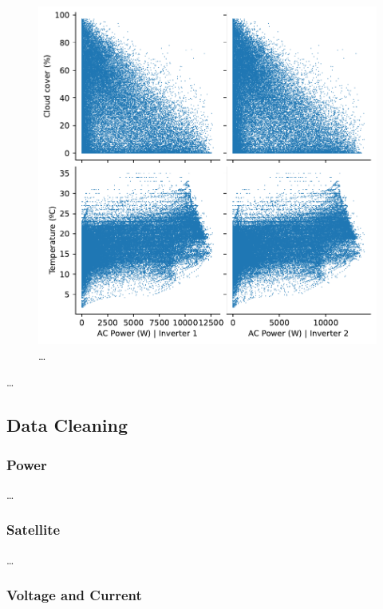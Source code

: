 \begin{figure}[h!]
    \centering
    \includegraphics[width=\textwidth]{figures/chapter5/analysis/12_power_meteo_pairplot_kb.pdf}
    \caption{\dots}
    \label{fig:eda_irrelevant_meteo}
\end{figure}

\dots

\subsection{Data Cleaning}

\subsubsection{Power}

\dots

\subsubsection{Satellite}

\dots

\subsubsection{Voltage and Current}

